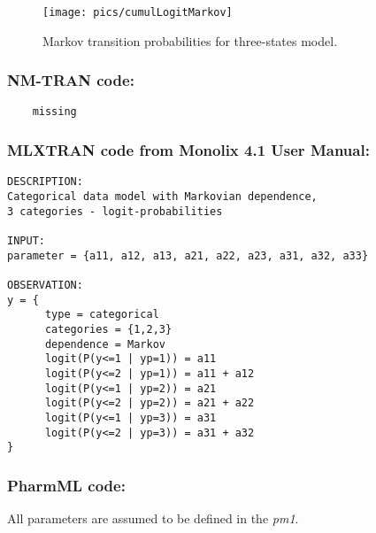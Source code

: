 \begin{figure}[htbp!]
\texttt{[image: pics/cumulLogitMarkov]} 
\caption{Markov transition probabilities for three-states model.}
\label{fig:cumulLogitMarkov}
\end{figure}

\subsubsection{NM-TRAN code:}

\myStartLine

\lstset{language=NONMEMdataSet}
\begin{lstlisting}
	missing
\end{lstlisting}

\myEndLine

\subsubsection{MLXTRAN code from Monolix 4.1 User Manual:}

\myStartLine

\begin{lstlisting}
DESCRIPTION:
Categorical data model with Markovian dependence,
3 categories - logit-probabilities

INPUT:
parameter = {a11, a12, a13, a21, a22, a23, a31, a32, a33}

OBSERVATION:
y = {
      type = categorical
      categories = {1,2,3}
      dependence = Markov
      logit(P(y<=1 | yp=1)) = a11
      logit(P(y<=2 | yp=1)) = a11 + a12
      logit(P(y<=1 | yp=2)) = a21
      logit(P(y<=2 | yp=2)) = a21 + a22
      logit(P(y<=1 | yp=3)) = a31
      logit(P(y<=2 | yp=3)) = a31 + a32
}
\end{lstlisting}

\myEndLine

\subsubsection{PharmML code:}
All parameters are assumed to be defined in the  \emph{pm1}.

